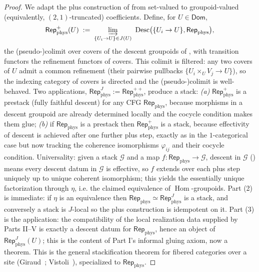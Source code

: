 \documentclass[12pt]{article}
\theoremstyle{definition}
\theoremstyle{remark}
\newcommand{\cat}[1]{\mathcal{#1}}
\newcommand{\Dom}{\mathsf{Dom}}
\newcommand{\Repp}{\mathsf{Rep}_{\mathrm{phys}}}
\newcommand{\Hom}{\operatorname{Hom}}
\begin{document}
\begin{proof}
We adapt the plus construction of  from set-valued to
groupoid-valued (equivalently, $(2,1)$-truncated) coefficients. Define, for
$U\in\Dom$,
\[
\Repp^{+}(U)\;:=\;\varinjlim_{\{U_i\to U\}\in J(U)}\ \mathrm{Desc}\bigl(\{U_i\to
U\},\Repp\bigr),
\]
the (pseudo-)colimit over covers of the descent groupoids of , with
transition functors the refinement functors of covers. This colimit is filtered: any two
covers of $U$ admit a common refinement (their pairwise pullbacks $\{U_i\times_U
V_j\to U\}$), so the indexing category of covers is directed and the (pseudo-)colimit is
well-behaved. Two applications, $\Repp^{J}:=
\Repp^{+\!+}$, produce a stack:
\emph{(a)} $\Repp^{+}$ is a prestack (fully faithful descent) for any CFG $\Repp$,
because morphisms in a descent groupoid are already determined locally and the cocycle
condition makes them glue; \emph{(b)} if $\Repp$ is a prestack then $\Repp^{+}$ is a
stack, because effectivity of descent is achieved after one further plus step, exactly
as in the $1$-categorical case but now tracking the coherence isomorphisms
$\varphi_{ij}$ and their cocycle condition. Universality: given a stack $\cat G$ and a
map $f:\Repp\to\cat G$, descent in $\cat G$ () means every descent
datum in $\cat G$ is effective, so $f$ extends over each plus step uniquely up to
unique coherent isomorphism; this yields the essentially unique factorization through
$\eta$, i.e. the claimed equivalence of $\Hom$-groupoids. Part (2) is immediate: if
$\eta$ is an equivalence then $\Repp\simeq\Repp^{J}$ is a stack, and conversely a stack
is $J$-local so the plus construction is idempotent on it. Part (3) is the application:
the compatibility of the local realization data supplied by Parts II--V is exactly a
descent datum for $\Repp$, hence an object of $\Repp^{J}(U)$; this is the content of Part
I's informal gluing axiom, now a theorem. This is the general stackification theorem for
fibered categories over a site (Giraud~\cite{Giraud}; Vistoli~\cite{Vistoli}),
specialized to $\Repp$.
\end{proof}

\begin{center}
\end{center}
\end{document}

